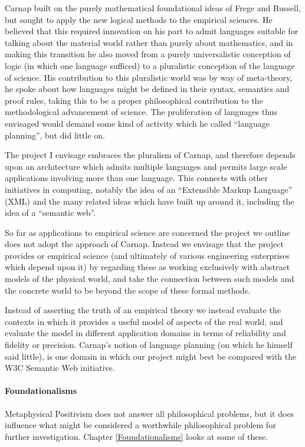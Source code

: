 Carnap built on the purely mathematical foundational ideas of Frege
and Russell, but sought to apply the new logical methods to the
empirical sciences.
He believed that this required innovation on his part to admit
languages suitable for talking about the material world rather than
purely about mathematics, and in making this transition he also moved
from a purely universalistic conception of logic (in which one language
sufficed) to a pluralistic conception of the language of science.
His contribution to this pluralistic world was by way of meta-theory,
he spoke about how languages might be defined in their syntax,
semantics and proof rules, taking this to be a proper philosophical
contribution to the methodological advancement of science.
The proliferation of languages thus envisaged would demand some kind
of activity which he called ``language planning'', but did little on.

The project I envisage embraces the pluralism of Carnap, and therefore
depends upon an architecture which admits multiple languages and
permits large scale applications involving more than one language.
This connects with other initiatives in computing, notably the idea of
an ``Extensible Markup Language'' (XML) and the many related ideas
which have built up around it, including the idea of a ``semantic web''.

So far as applications to empirical science are concerned the project
we outline does not adopt the approach of Carnap.
Instead we envisage that the project provides or empirical science
(and ultimately of various engineering enterprises which depend upon it)
by regarding these as working exclusively with abstract models of the
physical world, and take the connection between such models and the
concrete world to be beyond the scope of these formal methods.

Instead of asserting the truth of an empirical theory we instead
evaluate the contexts in which it provides a useful model of aspects
of the real world, and evaluate the model in different application
domains in terms of reliability and fidelity or precision.
Carnap's notion of language planning (on which he himself said
little), is one domain in which our project might best be compared
with the W3C Semantic Web initiative.

\paragraph{Foundationalisms}

Metaphysical Positivism does not answer all philosophical problems,
but it does influence what might be considered a worthwhile
philosophical problem for further investigation.
Chapter \ref{Foundationalisms} looks at some of these.

